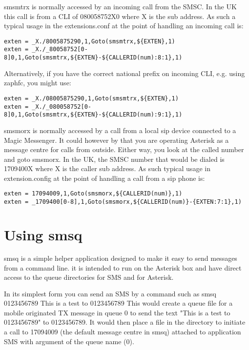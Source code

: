    smsmtrx is normally accessed by an incoming call from the SMSC. In the
   UK this call is from a CLI of 080058752X0 where X is the sub address.
   As such a typical usage in the extensions.conf at the point of
   handling an incoming call is:
\begin{astlisting}
\begin{verbatim}
exten = _X./8005875290,1,Goto(smsmtrx,${EXTEN},1)
exten = _X./_80058752[0-8]0,1,Goto(smsmtrx,${EXTEN}-${CALLERID(num):8:1},1)
\end{verbatim}
\end{astlisting}

   Alternatively, if you have the correct national prefix on incoming
   CLI, e.g. using zaphfc, you might use:
\begin{astlisting}
\begin{verbatim}
exten = _X./08005875290,1,Goto(smsmtrx,${EXTEN},1)
exten = _X./_080058752[0-8]0,1,Goto(smsmtrx,${EXTEN}-${CALLERID(num):9:1},1)
\end{verbatim}
\end{astlisting}

   smsmorx is normally accessed by a call from a local sip device
   connected to a Magic Messenger. It could however by that you are
   operating Asterisk as a message centre for calls from outside. Either
   way, you look at the called number and goto smsmorx. In the UK, the
   SMSC number that would be dialed is 1709400X where X is the caller sub
   address. As such typical usage in extension.config at the point of
   handling a call from a sip phone is:
\begin{astlisting}
\begin{verbatim}
exten = 17094009,1,Goto(smsmorx,${CALLERID(num)},1)
exten = _1709400[0-8],1,Goto(smsmorx,${CALLERID(num)}-{EXTEN:7:1},1)
\end{verbatim}
\end{astlisting}

\section{Using smsq}

   smsq is a simple helper application designed to make it easy to send
   messages from a command line. it is intended to run on the Asterisk
   box and have direct access to the queue directories for SMS and for
   Asterisk.

   In its simplest form you can send an SMS by a command such as
   smsq 0123456789 This is a test to 0123456789
   This would create a queue file for a mobile originated TX message in
   queue 0 to send the text "This is a test to 0123456789" to 0123456789.
   It would then place a file in the 
   directory to initiate a call to 17094009 (the default message centre
   in smsq) attached to application SMS with argument of the queue name
   (0).

